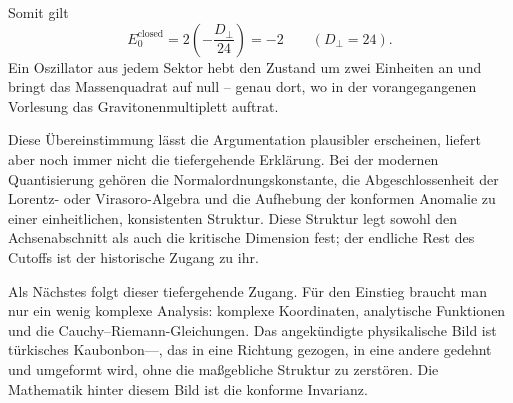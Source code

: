 \begin{classroomqa}\end{classroomqa}

Somit gilt
\begin{equation}
  E_0^{\mathrm{closed}}
  =
  2\left(-\frac{D_\perp}{24}\right)
  =-2
  \qquad (D_\perp=24).
\end{equation}
Ein Oszillator aus jedem Sektor hebt den Zustand um zwei Einheiten an und bringt das Massenquadrat auf null – genau dort, wo in der vorangegangenen Vorlesung das Gravitonenmultiplett auftrat.

Diese Übereinstimmung lässt die Argumentation plausibler erscheinen, liefert aber noch immer nicht die tiefergehende Erklärung. Bei der modernen Quantisierung gehören die Normalordnungskonstante, die Abgeschlossenheit der Lorentz- oder Virasoro-Algebra und die Aufhebung der konformen Anomalie zu einer einheitlichen, konsistenten Struktur. Diese Struktur legt sowohl den Achsenabschnitt als auch die kritische Dimension fest; der endliche Rest des Cutoffs ist der historische Zugang zu ihr.

Als Nächstes folgt dieser tiefergehende Zugang. Für den Einstieg braucht man nur ein wenig komplexe Analysis: komplexe Koordinaten, analytische Funktionen und die Cauchy--Riemann-Gleichungen. Das angekündigte physikalische Bild ist türkisches Kaubonbon---, das in eine Richtung gezogen, in eine andere gedehnt und umgeformt wird, ohne die maßgebliche Struktur zu zerstören. Die Mathematik hinter diesem Bild ist die konforme Invarianz.